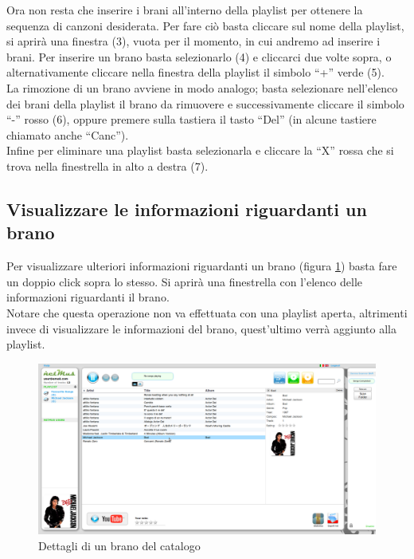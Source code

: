 Ora non resta che inserire i brani all'interno della playlist
per ottenere la sequenza di canzoni desiderata. Per fare ci\`o basta cliccare sul
nome della playlist, si aprir\`a una finestra (3), vuota per il momento, in cui
andremo ad inserire i brani. Per inserire un brano basta
selezionarlo (4) e cliccarci due volte sopra, o alternativamente cliccare nella
finestra della playlist il simbolo ``+'' verde (5).\\ 
La rimozione di un brano avviene in modo analogo; basta selezionare
nell'elenco dei brani della playlist il brano da rimuovere e successivamente
cliccare il simbolo ``-'' rosso (6), oppure premere sulla tastiera il tasto
``Del'' (in alcune tastiere chiamato anche ``Canc'').\\

Infine per eliminare una playlist basta selezionarla e cliccare la ``X'' rossa che
si trova nella finestrella in alto a destra (7).

\newpage
\subsection{Visualizzare le informazioni riguardanti un brano}

Per visualizzare ulteriori informazioni riguardanti un brano (figura
\ref{fig:dettagli}) basta fare un doppio click sopra lo stesso. Si aprir\`a una
finestrella con l'elenco delle informazioni riguardanti il brano.\\
Notare che questa operazione non va effettuata con una playlist aperta,
altrimenti invece di visualizzare le informazioni del brano, quest'ultimo
verr\`a aggiunto alla playlist.\\

\begin{figure}[!htbp]
  \centering
  \includegraphics[width=14cm]{img/MU/info_song.png}
\caption{Dettagli di un brano del catalogo}
\label{fig:dettagli}
\end{figure}

